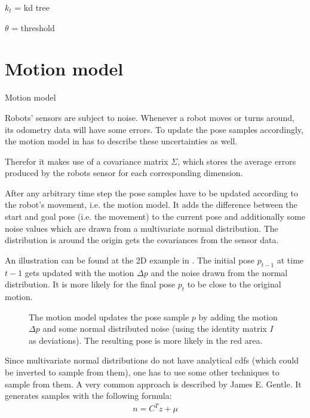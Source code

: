 \documentclass[Thesis.tex]{subfiles}
\begin{document}
$k_{t}$ = kd tree

$\theta$ = threshold
%
%
%
%
%
%
\section{Motion model}\label{sec:motion_model_section}
%
\begin{algorithm}[!htp]
\caption{Motion model}
\label{alg:motionmodel}

\end{algorithm}
%
Robots' sensors are subject to noise. Whenever a robot moves or turns around, its odometry data will have some errors.
To update the pose samples accordingly, the motion model in  has to describe these uncertainties as well.

Therefor it makes use of a covariance matrix $\Sigma$, which stores the average errors produced by the robots sensor for each corresponding dimension.

After any arbitrary time step the pose samples have to be updated according to the robot's movement, i.e. the motion model. It adds the difference between the start and goal pose (i.e. the movement) to the current pose and additionally some noise values which are drawn from a multivariate normal distribution. The distribution is around the origin gets the covariances from the sensor data. 

An illustration can be found at the 2D example in . The initial pose $p_{t-1}$ at time $t-1$ gets updated with the motion $\Delta p$ and the noise drawn from the normal distribution. It is more likely for the final pose $p_t$ to be close to the original motion.
\begin{figure}[!htp]
  \caption{The motion model updates the pose sample $p$ by adding the motion $\Delta p$ and some normal distributed noise (using the identity matrix $I$ as deviations). The resulting pose is more likely in the red area.}
  \label{fig:2d_noise_sampling}
\end{figure}
%
Since multivariate normal distributions do not have analytical \gls{cdf}s (which could be inverted to sample from them), one has to use some other techniques to sample from them. A very common approach is described by James E. Gentle\cite[p.~197]{Gentle:2005}. It generates samples with the following formula:
%
\begin{align}
n = C^T z + \mu
\end{align}
\end{document}
